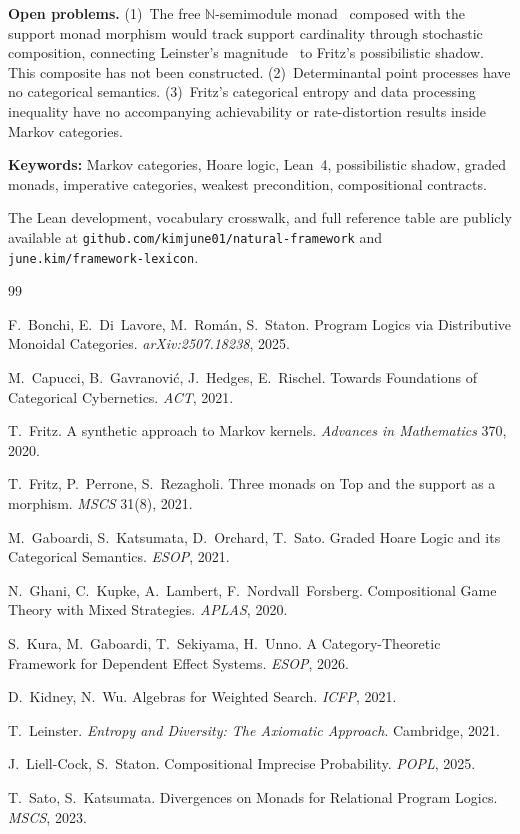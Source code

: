 \documentclass[11pt,a4paper]{article}
\begin{document}
\medskip\noindent\textbf{Open problems.}
(1)~The free $\mathbb{N}$-semimodule monad~\cite{KW2021} composed with the support monad morphism would track support cardinality through stochastic composition, connecting Leinster's magnitude~\cite{Leinster2021} to Fritz's possibilistic shadow. This composite has not been constructed.
(2)~Determinantal point processes have no categorical semantics.
(3)~Fritz's categorical entropy and data processing inequality have no accompanying achievability or rate-distortion results inside Markov categories.

\medskip\noindent\textbf{Keywords:} Markov categories, Hoare logic, Lean~4, possibilistic shadow, graded monads, imperative categories, weakest precondition, compositional contracts.

\medskip\noindent
The Lean development, vocabulary crosswalk, and full reference table are publicly available at \texttt{github.com/kimjune01/natural-framework} and \texttt{june.kim/framework-lexicon}.

\begin{thebibliography}{99}
\small

F.~Bonchi, E.~Di~Lavore, M.~Rom\'an, S.~Staton.
Program Logics via Distributive Monoidal Categories.
\textit{arXiv:2507.18238}, 2025.

M.~Capucci, B.~Gavranovi\'c, J.~Hedges, E.~Rischel.
Towards Foundations of Categorical Cybernetics.
\textit{ACT}, 2021.

T.~Fritz.
A synthetic approach to Markov kernels.
\textit{Advances in Mathematics} 370, 2020.

T.~Fritz, P.~Perrone, S.~Rezagholi.
Three monads on Top and the support as a morphism.
\textit{MSCS} 31(8), 2021.

M.~Gaboardi, S.~Katsumata, D.~Orchard, T.~Sato.
Graded Hoare Logic and its Categorical Semantics.
\textit{ESOP}, 2021.

N.~Ghani, C.~Kupke, A.~Lambert, F.~Nordvall~Forsberg.
Compositional Game Theory with Mixed Strategies.
\textit{APLAS}, 2020.

S.~Kura, M.~Gaboardi, T.~Sekiyama, H.~Unno.
A Category-Theoretic Framework for Dependent Effect Systems.
\textit{ESOP}, 2026.

D.~Kidney, N.~Wu.
Algebras for Weighted Search.
\textit{ICFP}, 2021.

T.~Leinster.
\textit{Entropy and Diversity: The Axiomatic Approach}.
Cambridge, 2021.

J.~Liell-Cock, S.~Staton.
Compositional Imprecise Probability.
\textit{POPL}, 2025.

T.~Sato, S.~Katsumata.
Divergences on Monads for Relational Program Logics.
\textit{MSCS}, 2023.

\end{thebibliography}
\end{document}
